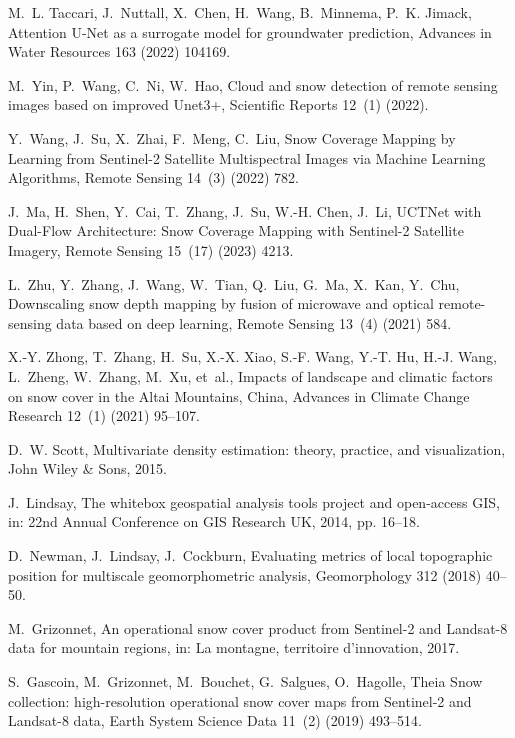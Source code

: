 \documentclass[preprint,12pt]{elsarticle}
\begin{document}
M.~L. Taccari, J.~Nuttall, X.~Chen, H.~Wang, B.~Minnema, P.~K. Jimack, {Attention U-Net as a surrogate model for groundwater prediction}, Advances in Water Resources 163 (2022) 104169.

M.~Yin, P.~Wang, C.~Ni, W.~Hao, {Cloud and snow detection of remote sensing images based on improved Unet3+}, Scientific Reports 12~(1) (2022).

Y.~Wang, J.~Su, X.~Zhai, F.~Meng, C.~Liu, {Snow Coverage Mapping by Learning from Sentinel-2 Satellite Multispectral Images via Machine Learning Algorithms}, Remote Sensing 14~(3) (2022) 782.

J.~Ma, H.~Shen, Y.~Cai, T.~Zhang, J.~Su, W.-H. Chen, J.~Li, {UCTNet with Dual-Flow Architecture: Snow Coverage Mapping with Sentinel-2 Satellite Imagery}, Remote Sensing 15~(17) (2023) 4213.

L.~Zhu, Y.~Zhang, J.~Wang, W.~Tian, Q.~Liu, G.~Ma, X.~Kan, Y.~Chu, Downscaling snow depth mapping by fusion of microwave and optical remote-sensing data based on deep learning, Remote Sensing 13~(4) (2021) 584.

X.-Y. Zhong, T.~Zhang, H.~Su, X.-X. Xiao, S.-F. Wang, Y.-T. Hu, H.-J. Wang, L.~Zheng, W.~Zhang, M.~Xu, et~al., {Impacts of landscape and climatic factors on snow cover in the Altai Mountains, China}, Advances in Climate Change Research 12~(1) (2021) 95--107.

D.~W. Scott, Multivariate density estimation: theory, practice, and visualization, John Wiley \& Sons, 2015.

J.~Lindsay, {The whitebox geospatial analysis tools project and open-access GIS}, in: 22nd Annual Conference on GIS Research UK, 2014, pp. 16--18.

D.~Newman, J.~Lindsay, J.~Cockburn, Evaluating metrics of local topographic position for multiscale geomorphometric analysis, Geomorphology 312 (2018) 40--50.

M.~Grizonnet, {An operational snow cover product from Sentinel-2 and Landsat-8 data for mountain regions}, in: La montagne, territoire d'innovation, 2017.

S.~Gascoin, M.~Grizonnet, M.~Bouchet, G.~Salgues, O.~Hagolle, {Theia Snow collection: high-resolution operational snow cover maps from Sentinel-2 and Landsat-8 data}, Earth System Science Data 11~(2) (2019) 493--514.
\end{document}
